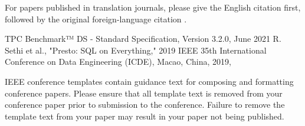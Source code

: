 \documentclass[conference]{IEEEtran}
\begin{document}
For papers published in translation journals, please give the English 
citation first, followed by the original foreign-language citation \cite{b6}.

\begin{thebibliography}{00}
 TPC Benchmark™ DS - Standard Specification, Version 3.2.0, June 2021
 R. Sethi et al., "Presto: SQL on Everything," 2019 IEEE 35th International Conference on Data Engineering (ICDE), Macao, China, 2019,
\end{thebibliography}
\vspace{12pt}
\color{red}
IEEE conference templates contain guidance text for composing and formatting conference papers. Please ensure that all template text is removed from your conference paper prior to submission to the conference. Failure to remove the template text from your paper may result in your paper not being published.
\end{document}

